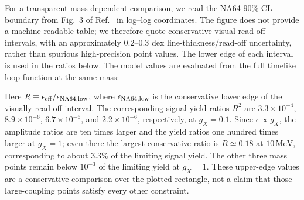 \documentclass[12pt,a4paper]{article}
\begin{document}
For a transparent mass-dependent comparison, we read the NA64 90\% CL boundary from Fig.~3 of Ref.~\cite{NA64:2023lightDM} in log--log coordinates. The figure does not provide a machine-readable table; we therefore quote conservative visual-read-off intervals, with an approximately \(0.2\)--\(0.3\) dex line-thickness/read-off uncertainty, rather than spurious high-precision point values. The lower edge of each interval is used in the ratios below. The model values are evaluated from the full timelike loop function at the same mass:
\begin{center}
\small
{}
\end{center}
Here \(R\equiv\epsilon_{\rm eff}/\epsilon_{\rm NA64,low}\), where \(\epsilon_{\rm NA64,low}\) is the conservative lower edge of the visually read-off interval. The corresponding signal-yield ratios \(R^2\) are \(3.3\times10^{-4}\), \(8.9\times10^{-6}\), \(6.7\times10^{-6}\), and \(2.2\times10^{-6}\), respectively, at \(g_X=0.1\). Since \(\epsilon\propto g_X\), the amplitude ratios are ten times larger and the yield ratios one hundred times larger at \(g_X=1\); even there the largest conservative ratio is \(R\simeq0.18\) at \(10\,\mathrm{MeV}\), corresponding to about \(3.3\%\) of the limiting signal yield. The other three mass points remain below \(10^{-3}\) of the limiting yield at \(g_X=1\). These upper-edge values are a conservative comparison over the plotted rectangle, not a claim that those large-coupling points satisfy every other constraint.
\end{document}
